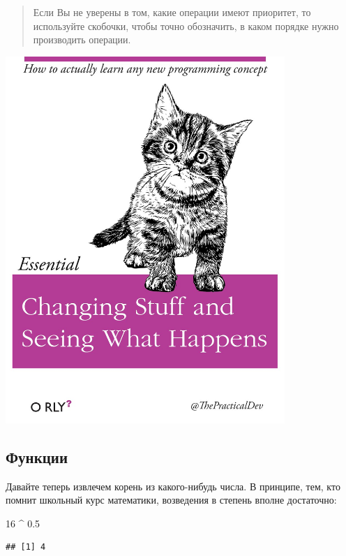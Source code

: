 \documentclass[
]{book}
\newenvironment{Shaded}{\begin{snugshade}}{\end{snugshade}}
\newcommand{\DecValTok}[1]{\textcolor[rgb]{0.00,0.00,0.81}{#1}}
\newcommand{\FloatTok}[1]{\textcolor[rgb]{0.00,0.00,0.81}{#1}}
\newcommand{\OperatorTok}[1]{\textcolor[rgb]{0.81,0.36,0.00}{\textbf{#1}}}
\newcommand{\StringTok}[1]{\textcolor[rgb]{0.31,0.60,0.02}{#1}}
\begin{document}
\begin{quote}
Если Вы не уверены в том, какие операции имеют приоритет, то используйте скобочки, чтобы точно обозначить, в каком порядке нужно производить операции.
\end{quote}

\includegraphics[width=4.16667in,height=\textheight]{images/ThePracticalDev_2016-Apr-13.jpg}

\hypertarget{func}{%
\subsection{Функции}\label{func}}

Давайте теперь извлечем корень из какого-нибудь числа. В принципе, тем, кто помнит школьный курс математики, возведения в степень вполне достаточно:

\begin{Shaded}
\begin{Highlighting}[]
\DecValTok{16} \OperatorTok{^}\StringTok{ }\FloatTok{0.5}
\end{Highlighting}
\end{Shaded}

\begin{verbatim}
## [1] 4
\end{verbatim}
\end{document}
